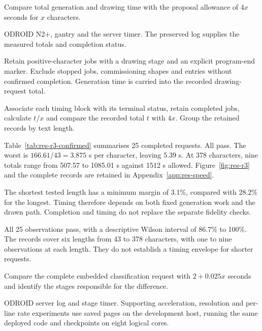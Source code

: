 Compare total generation and drawing time with the proposal allowance of $4x$ seconds for $x$ characters.

ODROID N2+, gantry and the server timer. The preserved log supplies the measured totals and completion status.

Retain positive-character jobs with a drawing stage and an explicit program-end marker. Exclude stopped jobs, commissioning shapes and entries without confirmed completion. Generation time is carried into the recorded drawing-request total.

Associate each timing block with its terminal status, retain completed jobs, calculate $t/x$ and compare the recorded total $t$ with $4x$. Group the retained records by text length.

Table~\ref{tab:res-r3-confirmed} summarises 25 completed requests. All pass. The worst is $166.61/43=3.875$ s per character, leaving 5.39 s. At 378 characters, nine totals range from 507.57 to 1085.01 s against 1512 s allowed. Figure~\ref{fig:res-r3} and the complete records are retained in Appendix~\ref{app:res-speed}.


The shortest tested length has a minimum margin of 3.1\%, compared with 28.2\% for the longest. Timing therefore depends on both fixed generation work and the drawn path. Completion and timing do not replace the separate fidelity checks.

All 25 observations pass, with a descriptive Wilson interval of 86.7\% to 100\%. The records cover six lengths from 43 to 378 characters, with one to nine observations at each length. They do not establish a timing envelope for shorter requests.

Compare the complete embedded classification request with $2+0.025x$ seconds and identify the stages responsible for the difference.

ODROID server log and stage timer. Supporting acceleration, resolution and per-line rate experiments use saved pages on the development host, running the same deployed code and checkpoints on eight logical cores.

